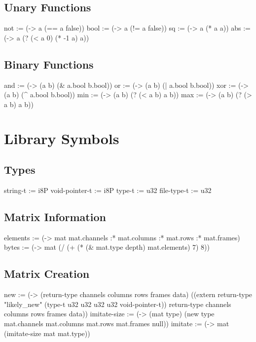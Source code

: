 \documentclass[twoside=false, numbers=noenddot]{scrbook}
\newenvironment{likely}
{ \verbatim }
{ \endverbatim }
\begin{document}
\section{Unary Functions}
\begin{likely}
not  := (-> a (== a false))
bool := (-> a (!= a false))
sq  := (-> a (* a a))
abs := (-> a (? (< a 0) (* -1 a) a))
\end{likely}

\section{Binary Functions}
\begin{likely}
and := (-> (a b) (& a.bool b.bool))
or  := (-> (a b) (| a.bool b.bool))
xor := (-> (a b) (^ a.bool b.bool))
min := (-> (a b) (? (< a b) a b))
max := (-> (a b) (? (> a b) a b))
\end{likely}

\chapter{Library Symbols}
\section{Types}
\begin{likely}
string-t       := i8P
void-pointer-t := i8P
type-t         := u32
file-type-t    := u32
\end{likely}

\section{Matrix Information}
\begin{likely}
elements := (-> mat mat.channels :* mat.columns :* mat.rows :* mat.frames)
bytes    := (-> mat (/ (+ (* (& mat.type depth) mat.elements) 7) 8))
\end{likely}

\section{Matrix Creation}
\begin{likely}
new := (-> (return-type channels columns rows frames data)
           ((extern return-type "likely_new" (type-t u32 u32 u32 u32 void-pointer-t)) return-type channels columns rows frames data))
imitate-size := (-> (mat type) (new type mat.channels mat.columns mat.rows mat.frames null))
imitate := (-> mat (imitate-size mat mat.type))
\end{likely}
\end{document}
